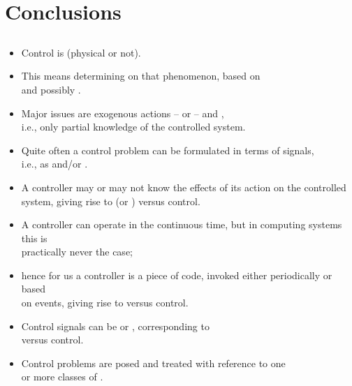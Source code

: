 \section{Conclusions}
\subsection{}

\begin{frame}
\myPause
 \begin{itemize}[<+-| alert@+>]
 \item Control is  (physical or not).
 \item This means determining  on that phenomenon, based on \\
       and possibly .
 \item Major issues are exogenous actions -- or  -- and ,\\
       i.e., only partial knowledge of the controlled system.
 \item Quite often a control problem can be formulated in terms of signals,\\
       i.e., as  and/or .
 \end{itemize}
\end{frame}

\begin{frame}
\myPause
 \begin{itemize}[<+-| alert@+>]
 \item A controller may or may not know the effects of its action on the controlled system, giving rise to
        (or ) versus  control.
 \item A controller can operate in the continuous time, but in computing systems this is\\
       practically never the case;
 \item hence for us a controller is a piece of code, invoked either periodically or based\\
       on events, giving rise to  versus  control.
 \item Control signals can be  or , corresponding to \\
       versus  control.
 \item Control problems are posed and treated with reference to one\\
       or more classes of . 
 \end{itemize}
\end{frame}

